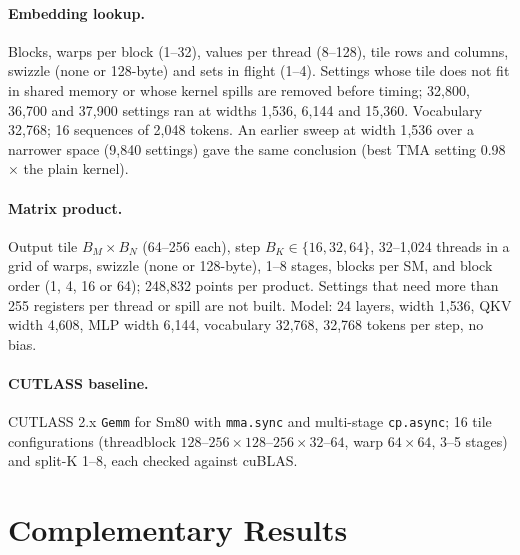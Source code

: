 \documentclass[10pt]{article}
\newcommand{\x}{\ensuremath{\times}}
\begin{document}
\paragraph{Embedding lookup.}
Blocks, warps per block (1--32), values per thread (8--128), tile rows and columns, swizzle (none or 128-byte) and sets in
flight (1--4). Settings whose tile does not fit in shared memory or whose kernel spills are removed before timing; 32{,}800,
36{,}700 and 37{,}900 settings ran at widths 1{,}536, 6{,}144 and 15{,}360. Vocabulary 32{,}768; 16 sequences of 2{,}048
tokens. An earlier sweep at width 1{,}536 over a narrower space (9{,}840 settings) gave the same conclusion (best TMA
setting 0.98\x{} the plain kernel).

\paragraph{Matrix product.}
Output tile $B_M \times B_N$ (64--256 each), step $B_K \in \{16, 32, 64\}$, 32--1{,}024 threads in a grid of warps, swizzle
(none or 128-byte), 1--8 stages, blocks per SM, and block order (1, 4, 16 or 64); 248{,}832 points per product. Settings that
need more than 255 registers per thread or spill are not built. Model: 24 layers, width 1{,}536, QKV width 4{,}608, MLP width
6{,}144, vocabulary 32{,}768, 32{,}768 tokens per step, no bias.

\paragraph{CUTLASS baseline.}
CUTLASS 2.x \texttt{Gemm} for Sm80 with \texttt{mma.sync} and multi-stage \texttt{cp.async}; 16 tile configurations
(threadblock $128$--$256 \times 128$--$256 \times 32$--$64$, warp $64\times64$, 3--5 stages) and split-K 1--8, each checked
against cuBLAS.

\section{Complementary Results}
\label{app:results}
\end{document}
